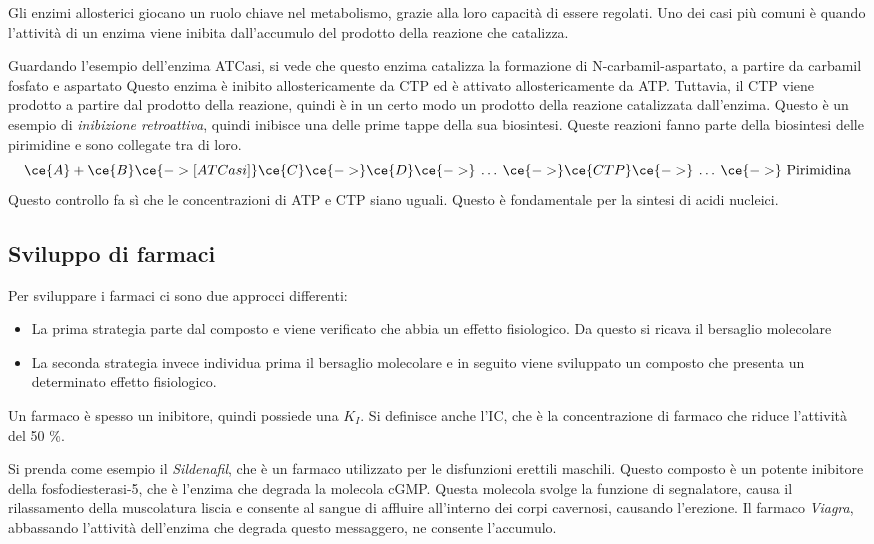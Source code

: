
Gli enzimi allosterici giocano un ruolo chiave nel metabolismo, grazie alla loro capacità di essere regolati. Uno dei casi più comuni è quando l'attività di un enzima viene inibita dall'accumulo del prodotto della reazione che catalizza.

Guardando l'esempio dell'enzima ATCasi, si vede che questo enzima catalizza la formazione di N-carbamil-aspartato, a partire da carbamil fosfato e aspartato Questo enzima è inibito allostericamente da CTP ed è attivato allostericamente da ATP.
Tuttavia, il CTP viene prodotto a partire dal prodotto della reazione, quindi è in un certo modo un prodotto della reazione catalizzata dall'enzima. Questo è un esempio di \emph{inibizione retroattiva}, quindi inibisce una delle prime tappe della sua biosintesi. Queste reazioni fanno parte della biosintesi delle pirimidine e sono collegate tra di loro.
\[
\ce{A} + \ce{B} \ce{->[ATCasi]} \ce{C} \ce{->} \ce{D} \ce{->} \: \dots \: \ce{->} \ce{CTP} \ce{->} \: \dots \: \ce{->} \text{ Pirimidina}
\]
Questo controllo fa sì che le concentrazioni di ATP e CTP siano uguali. Questo è fondamentale per la sintesi di acidi nucleici.

\subsection{Sviluppo di farmaci}

Per sviluppare i farmaci ci sono due approcci differenti:
\begin{itemize}
\item La prima strategia parte dal composto e viene verificato che abbia un effetto fisiologico. Da questo si ricava il bersaglio molecolare
\item La seconda strategia invece individua prima il bersaglio molecolare e in seguito viene sviluppato un composto che presenta un determinato effetto fisiologico.
\end{itemize}
Un farmaco è spesso un inibitore, quindi possiede una $K_I$. Si definisce anche l'IC, che è la concentrazione di farmaco che riduce l'attività del 50 \%.


Si prenda come esempio il \emph{Sildenafil}, che è un farmaco utilizzato per le disfunzioni erettili maschili. Questo composto è un potente inibitore della fosfodiesterasi-5, che è l'enzima che degrada la molecola cGMP. Questa molecola svolge la funzione di segnalatore, causa il rilassamento della muscolatura liscia e consente al sangue di affluire all'interno dei corpi cavernosi, causando l'erezione. Il farmaco \emph{Viagra}, abbassando l'attività dell'enzima che degrada questo messaggero, ne consente l'accumulo.

